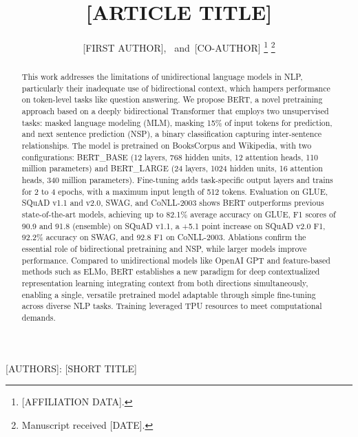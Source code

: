 \documentclass[journal]{IEEEtran}
\begin{document}
\title{[ARTICLE TITLE]}

\author{[FIRST AUTHOR],~
        and~[CO-AUTHOR]%
\thanks{[AFFILIATION DATA].}%
\thanks{Manuscript received [DATE].}}

%
{[AUTHORS]: [SHORT TITLE]}

\maketitle

\begin{abstract}
This work addresses the limitations of unidirectional language models in NLP, particularly their inadequate use of bidirectional context, which hampers performance on token-level tasks like question answering. We propose BERT, a novel pretraining approach based on a deeply bidirectional Transformer that employs two unsupervised tasks: masked language modeling (MLM), masking 15\% of input tokens for prediction, and next sentence prediction (NSP), a binary classification capturing inter-sentence relationships. The model is pretrained on BooksCorpus and Wikipedia, with two configurations: BERT\_BASE (12 layers, 768 hidden units, 12 attention heads, 110 million parameters) and BERT\_LARGE (24 layers, 1024 hidden units, 16 attention heads, 340 million parameters). Fine-tuning adds task-specific output layers and trains for 2 to 4 epochs, with a maximum input length of 512 tokens. Evaluation on GLUE, SQuAD v1.1 and v2.0, SWAG, and CoNLL-2003 shows BERT outperforms previous state-of-the-art models, achieving up to 82.1\% average accuracy on GLUE, F1 scores of 90.9 and 91.8 (ensemble) on SQuAD v1.1, a +5.1 point increase on SQuAD v2.0 F1, 92.2\% accuracy on SWAG, and 92.8 F1 on CoNLL-2003. Ablations confirm the essential role of bidirectional pretraining and NSP, while larger models improve performance. Compared to unidirectional models like OpenAI GPT and feature-based methods such as ELMo, BERT establishes a new paradigm for deep contextualized representation learning integrating context from both directions simultaneously, enabling a single, versatile pretrained model adaptable through simple fine-tuning across diverse NLP tasks. Training leveraged TPU resources to meet computational demands.
\end{abstract}
\end{document}
